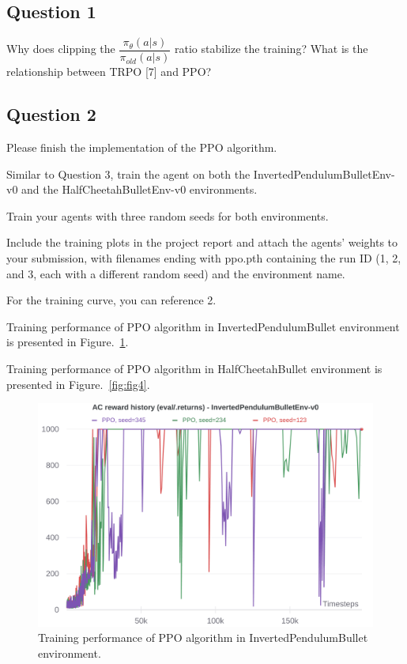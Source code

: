 \documentclass[12pt]{article}
\begin{document}
\subsection*{Question 1}

Why does clipping the $\dfrac{\pi_{\theta}(a|s)}{\pi_{old}(a|s)}$ ratio stabilize the training? What is the relationship between TRPO [7] and PPO?

\subsection*{Question 2}

Please finish the implementation of the PPO algorithm.
\newline

\noindent
Similar to Question 3, train the agent on both the InvertedPendulumBulletEnv-v0 and the HalfCheetahBulletEnv-v0 environments.
\newline

\noindent
Train your agents with three random seeds for both environments. 
\newline

\noindent
Include the training plots in the project report and attach the agents’ weights to your submission, with filenames ending with ppo.pth containing the run ID (1, 2, and 3, each with a different random seed) and the environment name. 
\newline

\noindent
For the training curve, you can reference 2. 


Training performance of PPO algorithm in InvertedPendulumBullet environment is presented in Figure.~\ref*{fig:fig3}.
\newline

Training performance of PPO algorithm in HalfCheetahBullet environment is presented in Figure.~\ref*{fig:fig4}.
\newline


\pagebreak

\begin{figure}[pht] 
	\centering  %
    \includegraphics[width=0.65\columnwidth]{img/Figure_3_WB_InvertedPendulumBullet_PPO.png}
	\caption{Training performance of PPO algorithm in InvertedPendulumBullet environment.}
	\label{fig:fig3}
\end{figure}
\end{document}
